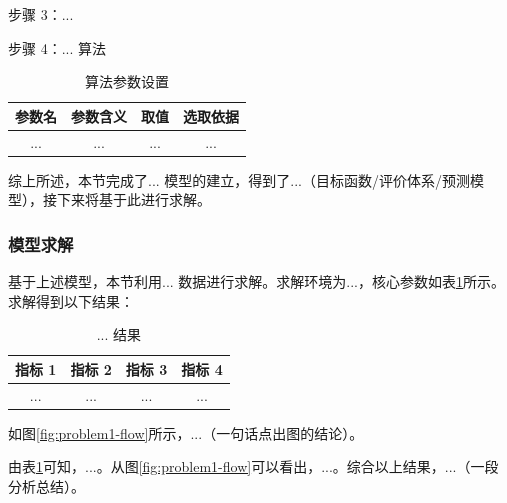 步骤 3：...

步骤 4：... 算法

\begin{table}[htbp]
	\caption{算法参数设置}
	\centering
	\begin{tabular}{cccc}
		\toprule
		参数名 & 参数含义 & 取值 & 选取依据 \\
		\midrule
		... & ... & ... & ... \\
		\bottomrule
	\end{tabular}
\end{table}

综上所述，本节完成了... 模型的建立，得到了...（目标函数/评价体系/预测模型），接下来将基于此进行求解。

\subsubsection{模型求解}

基于上述模型，本节利用... 数据进行求解。求解环境为...，核心参数如表\ref{tab:solution-result}所示。求解得到以下结果：

\begin{table}[htbp]
	\caption{... 结果}
	\label{tab:solution-result}
	\centering
	\begin{tabular}{cccc}
		\toprule
		指标 1 & 指标 2 & 指标 3 & 指标 4 \\
		\midrule
		... & ... & ... & ... \\
		\bottomrule
	\end{tabular}
\end{table}

如图\ref{fig:problem1-flow}所示，...（一句话点出图的结论）。

由表\ref{tab:solution-result}可知，...。从图\ref{fig:problem1-flow}可以看出，...。综合以上结果，...（一段分析总结）。
